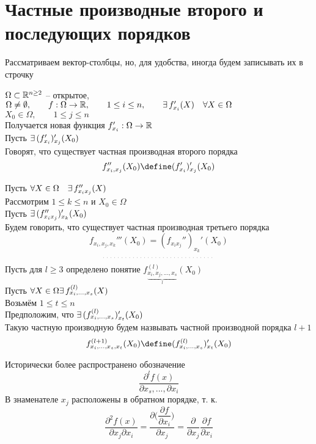 \section{Частные производные второго и последующих порядков}

Рассматриваем вектор-столбцы, но, для удобства, иногда будем записывать их в строчку

\begin{definition}
	$ \Omega \subset \mathbb{R}^{n \ge 2} $ -- открытое, $ \Omega \ne \emptyset, \qquad f : \Omega \to \mathbb{R}, \qquad 1 \le i \le n, \qquad \exists\, f_{x_i}'(X) \quad \forall X \in \Omega $ \\
	$ X_0 \in \Omega, \qquad 1 \le j \le n $ \\
	Получается новая функция $ f_{x_i}' : \Omega \to \mathbb{R} $ \\
	Пусть $ \exists\, (f_{x_i}')_{x_j}'(X_0) $ \\
	Говорят, что существует частная производная второго порядка
	$$ f_{x_i,x_j}''(X_0) \define (f_{x_i}')_{x_j}'(X_0) $$
\end{definition}

\begin{definition}
	Пусть $ \forall X \in \Omega \quad \exists\, f_{x_ix_j}''(X) $ \\
	Рассмотрим $ 1 \le k \le n $ и $ X_0 \in \Omega $ \\
	Пусть $ \exists\, (f_{x_ix_j}'')_{x_k}'(X_0) $ \\
	Будем говорить, что существует частная производная третьего порядка
	$$ f_{x_i,x_j,x_k}'''(X_0) = (f_{x_ix_j}'')_{x_k}'(X_0) $$
	$$ \widedots $$
	Пусть для $ l \ge 3 $ определено понятие $ f_{\underbrace{x_i, x_j, ..., x_s}_l}^{(l)}(X_0) $ \\
	Пусть $ \forall X \in \Omega \exists\, f_{x_i, ..., x_s}^{(l)}(X) $ \\
	Возьмём $ 1 \le t \le n $ \\
	Предположим, что $ \exists\, (f_{x_i, ..., x_s}^{(l)})_{x_t}'(X_0) $ \\
	Такую частную производную будем назвывать частной производной порядка $ l + 1 $
	$$ f_{x_i, ..., x_s, x_t}^{(l + 1)}(X_0) \define (f_{x_i, ..., x_s}^{(l)})_{x_t}'(X_0) $$
\end{definition}

\begin{notation}
	Исторически более распространено обозначение
	$$ \frac{\partial^l f(x)}{\partial x_s, ..., \partial x_i} $$
	В знаменателе $ x_j $ расположены в обратном порядке, т. к.
	$$ \frac{\partial^2f(x)}{\partial x_j \partial x_i} = \frac{\partial \bigg( \dfrac{\partial f}{\partial x_i} \bigg)}{\partial x_j} = \frac\partial{\partial x_j} \frac{\partial f}{\partial x_i} $$
\end{notation}

